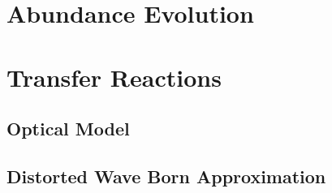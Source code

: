
\section{Abundance Evolution}


\section{Transfer Reactions}



\subsection{Optical Model} \label{subsec:Optical_Model}

\subsection{Distorted Wave Born Approximation} \label{subsec:DWBA}




